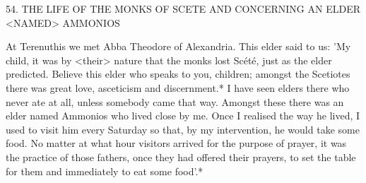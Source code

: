 54.
THE LIFE OF THE MONKS OF SCETE
AND CONCERNING AN ELDER <NAMED> AMMONIOS

At Terenuthis we met Abba Theodore of Alexandria.
This elder said
to us: 'My child, it was by <their> nature that the monks lost Scété,
just as the elder predicted.
Believe this elder who speaks to you,
children; amongst the Scetiotes there was great love, asceticism and
discernment.* I have seen elders there who never ate at all, unless
somebody came that way.
Amongst these there was an elder named
Ammonios who lived close by me.
Once I realised the way he lived,
I used to visit him every Saturday so that, by my intervention, he
would take some food.
No matter at what hour visitors arrived for
the purpose of prayer, it was the practice of those fathers, once they
had offered their prayers, to set the table for them and immediately
to eat some food'.*

